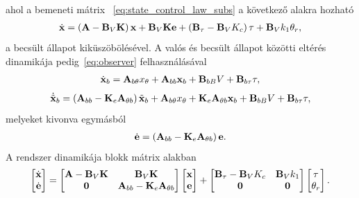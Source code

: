 ahol a bemeneti mátrix 
~\eqref{eq:state_control_law_subs} a következő alakra hozható
\begin{align}
    \dot{\mathbf{x}} = \left(\mathbf{A} - \mathbf{B}_V \mathbf{K}\right) \mathbf{x} + 
    \mathbf{B}_V \mathbf{K} \mathbf{e} + 
    \left(\mathbf{B}_\tau - \mathbf{B}_V K_c\right) \tau + 
    \mathbf{B}_V k_1 \theta_r,
\end{align}
a becsült állapot kiküszöbölésével. A valós és becsült állapot közötti eltérés dinamikája 
pedig~\eqref{eq:observer} felhasználásával
\begin{align}
    \dot{\mathbf{x}}_b = \mathbf{A}_{b\theta} x_\theta + \mathbf{A}_{bb} \mathbf{x}_b + 
    \mathbf{B}_{bB} V + \mathbf{B}_{b\tau} \tau,
\end{align}
\begin{align}
    \dot{\tilde{\mathbf{x}}}_b = \left(\mathbf{A}_{bb} - \mathbf{K}_e \mathbf{A}_{\theta b}\right) \tilde{\mathbf{x}}_b +
    \mathbf{A}_{b\theta} x_\theta +
    \mathbf{K}_e \mathbf{A}_{\theta b} \mathbf{x}_b +
    \mathbf{B}_{bB} V + \mathbf{B}_{b\tau} \tau,
\end{align}
melyeket kivonva egymásból
\begin{align}
    \dot{\mathbf{e}} = \left(\mathbf{A}_{bb} - \mathbf{K}_e \mathbf{A}_{\theta b}\right) \mathbf{e}.
\end{align}
A rendszer dinamikája blokk mátrix alakban
\begin{align}
    \begin{bmatrix}
        \dot{\mathbf{x}} \\
        \dot{\mathbf{e}}
    \end{bmatrix}
    =
    \begin{bmatrix}
        \mathbf{A} - \mathbf{B}_V \mathbf{K} & \mathbf{B}_V \mathbf{K} \\
        \mathbf{0} & \mathbf{A}_{bb} - \mathbf{K}_e \mathbf{A}_{\theta b}
    \end{bmatrix}
    \begin{bmatrix}
        \mathbf{x} \\
        \mathbf{e}
    \end{bmatrix}
    +
    \begin{bmatrix}
        \mathbf{B}_\tau - \mathbf{B}_V K_c & \mathbf{B}_V k_1\\
        \mathbf{0} & \mathbf{0}
    \end{bmatrix}
    \begin{bmatrix}
        \tau \\
        \theta_r
    \end{bmatrix}.
\end{align}

